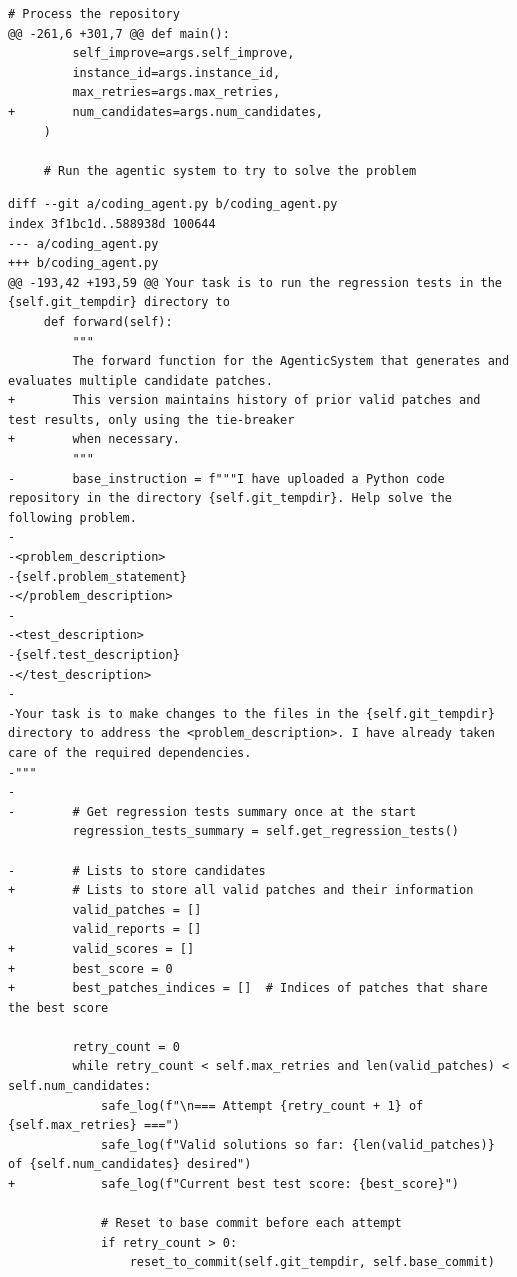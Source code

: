 \documentclass{article} %
\begin{document}
\begin{lstlisting}[style=diffstyle]
     # Process the repository
@@ -261,6 +301,7 @@ def main():
         self_improve=args.self_improve,
         instance_id=args.instance_id,
         max_retries=args.max_retries,
+        num_candidates=args.num_candidates,
     )
 
     # Run the agentic system to try to solve the problem
\end{lstlisting}


\begin{lstlisting}[style=diffstyle]
diff --git a/coding_agent.py b/coding_agent.py
index 3f1bc1d..588938d 100644
--- a/coding_agent.py
+++ b/coding_agent.py
@@ -193,42 +193,59 @@ Your task is to run the regression tests in the {self.git_tempdir} directory to
     def forward(self):
         """
         The forward function for the AgenticSystem that generates and evaluates multiple candidate patches.
+        This version maintains history of prior valid patches and test results, only using the tie-breaker
+        when necessary.
         """
-        base_instruction = f"""I have uploaded a Python code repository in the directory {self.git_tempdir}. Help solve the following problem.
-
-<problem_description>
-{self.problem_statement}
-</problem_description>
-
-<test_description>
-{self.test_description}
-</test_description>
-
-Your task is to make changes to the files in the {self.git_tempdir} directory to address the <problem_description>. I have already taken care of the required dependencies.
-"""
-
-        # Get regression tests summary once at the start
         regression_tests_summary = self.get_regression_tests()
 
-        # Lists to store candidates
+        # Lists to store all valid patches and their information
         valid_patches = []
         valid_reports = []
+        valid_scores = []
+        best_score = 0
+        best_patches_indices = []  # Indices of patches that share the best score
 
         retry_count = 0
         while retry_count < self.max_retries and len(valid_patches) < self.num_candidates:
             safe_log(f"\n=== Attempt {retry_count + 1} of {self.max_retries} ===")
             safe_log(f"Valid solutions so far: {len(valid_patches)} of {self.num_candidates} desired")
+            safe_log(f"Current best test score: {best_score}")
 
             # Reset to base commit before each attempt
             if retry_count > 0:
                 reset_to_commit(self.git_tempdir, self.base_commit)
             

\end{lstlisting}
\end{document}
